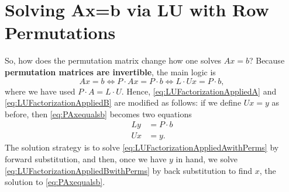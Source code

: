 \section{Solving Ax=b via LU with Row Permutations}
\label{sec:SolvingAxeqBviaLUrowPermutations}

\begin{tcolorbox}[sharp corners, colback=green!30, colframe=green!80!blue, title=\textbf{\large Solving $\boldsymbol{Ax=b}$ when $\mathbf A $ is square and $\boldsymbol{P \cdot A = L \cdot U}$}]
  So, how does the permutation matrix change how one solves $Ax=b$?  Because \textbf{permutation matrices are invertible}, the main logic is
  \begin{equation}
      \label{eq:PAxequalsb}
      Ax=b \iff P \cdot Ax = P \cdot b \iff L\cdot U x = P \cdot b,
  \end{equation}
        where we have used $P \cdot A = L \cdot U$. 
  Hence, \eqref{eq:LUFactorizationAppliedA} and \eqref{eq:LUFactorizationAppliedB} are modified as follows: if we define $Ux=y$ as before, then \eqref{eq:PAxequalsb} becomes two equations
\begin{align}
  \label{eq:LUFactorizationAppliedAwithPerms}
  L y &= P \cdot b \\
    \label{eq:LUFactorizationAppliedBwithPerms}
 U x &=y.
\end{align}
The solution strategy is to solve \eqref{eq:LUFactorizationAppliedAwithPerms} by forward substitution, and then, once we have $y$ in hand, we solve \eqref{eq:LUFactorizationAppliedBwithPerms}
by back substitution to find $x$, the solution to \eqref{eq:PAxequalsb}. 
\end{tcolorbox}



